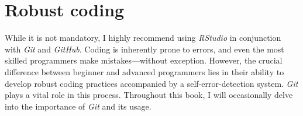 \documentclass[
]{book}
\begin{document}
\hypertarget{robust-coding}{%
\section{Robust coding}\label{robust-coding}}

While it is not mandatory, I highly recommend using \emph{RStudio} in conjunction with \emph{Git} and \emph{GitHub}. Coding is inherently prone to errors, and even the most skilled programmers make mistakes---without exception. However, the crucial difference between beginner and advanced programmers lies in their ability to develop robust coding practices accompanied by a self-error-detection system. \emph{Git} plays a vital role in this process. Throughout this book, I will occasionally delve into the importance of \emph{Git} and its usage.
\end{document}
